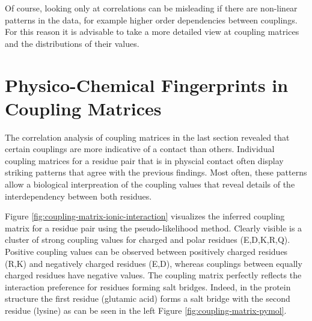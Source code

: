 \documentclass[12pt,a4paper,twoside]{book}
\theoremstyle{definition}
\theoremstyle{definition}
\theoremstyle{remark}
\begin{document}
Of course, looking only at correlations can be misleading if there are
non-linear patterns in the data, for example higher order dependencies
between couplings. For this reason it is advisable to take a more
detailed view at coupling matrices and the distributions of their
values.

\section{Physico-Chemical Fingerprints in Coupling
Matrices}\label{physico-chemical-fingerprints-in-coupling-matrices}

The correlation analysis of coupling matrices in the last section
revealed that certain couplings are more indicative of a contact than
others. Individual coupling matrices for a residue pair that is in
physcial contact often display striking patterns that agree with the
previous findings. Most often, these patterns allow a biological
interpreation of the coupling values that reveal details of the
interdependency between both residues.

Figure \ref{fig:coupling-matrix-ionic-interaction} visualizes the
inferred coupling matrix for a residue pair using the pseudo-likelihood
method. Clearly visible is a cluster of strong coupling values for
charged and polar residues (E,D,K,R,Q). Positive coupling values can be
observed between positively charged residues (R,K) and negatively
charged residues (E,D), whereas couplings between equally charged
residues have negative values. The coupling matrix perfectly reflects
the interaction preference for residues forming salt bridges. Indeed, in
the protein structure the first residue (glutamic acid) forms a salt
bridge with the second residue (lysine) as can be seen in the left
Figure \ref{fig:coupling-matrix-pymol}.
\end{document}
